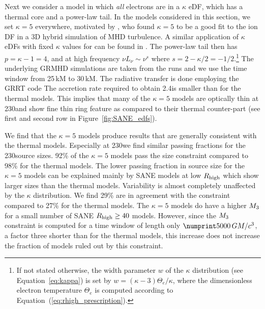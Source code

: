 Next we consider a model in which {\em all} electrons are in a $\kappa$ eDF, which has a thermal core and a power-law tail.
In the models considered in this section, we set $\kappa = 5$ everywhere,  motivated by \citet{2016PhRvL.117w5101K}, who found $\kappa = 5$ to be a good fit to the ion DF in a 3D hybrid simulation of MHD turbulence.
A similar application of $\kappa$ eDFs with fixed $\kappa$ values for \sgra can be found in \citet{davelaar2018}.
The power-law tail then has $p = \kappa - 1 = 4$, and at high frequency $\nu L_\nu \sim \nu^s$ where $s = 2 - \kappa/2 = -1/2$.\footnote{If not stated otherwise, the width parameter $w$ of the $\kappa$ distribution (see Equation~\ref{eq:kappa}) is set by $w = (\kappa - 3) \Theta_e/\kappa$, where the dimensionless electron temperature $\Theta_e$ is computed according to Equation~(\ref{eq:rhigh_prescription}).}
The underlying GRMHD simulations are taken from the \bhac runs and we use the time window from 25\,kM to 30\,kM.
The radiative transfer is done employing the GRRT code \bhoss \citep{Younsi2012,Younsi2020} 
The accretion rate required to obtain 2.4\Jy is smaller than for the thermal models.
This implies that many of the $\kappa=5$ models are optically thin at 230\GHz and show fine thin ring feature as compared to their thermal counter-part (see first and second row in Figure~\ref{fig:SANE_edfs}).


We find that the $\kappa=5$ models produce results that are generally consistent with the \bhac thermal models.
Especially at 230\GHz we find similar passing fractions for the 230\GHz source sizes.
92\% of the $\kappa=5$ models pass the size constraint compared to 98\% for the thermal models.
The lower passing fraction in source size for the $\kappa=5$ models can be explained mainly by SANE models at low $R_\mathrm{high}$ which show larger sizes than the thermal models.
Variability is almost completely unaffected by the $\kappa$ distribution.
We find 29\% are in agreement with the  constraint compared to 27\% for the thermal models.
The $\kappa=5$ models do have a higher $M_{3}$ for a small number of SANE $R_\mathrm{high} \geq 40$ models.
However, since the $M_{3}$ constraint is computed for a time window of length only $\no{5000}\,\tg$, a factor three shorter than for the thermal models, this increase does not increase the fraction of models ruled out by this constraint.

